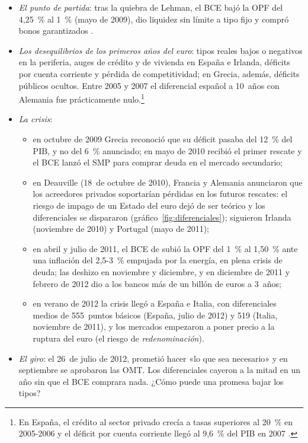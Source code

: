 \documentclass[11pt]{article}
\begin{document}
\begin{itemize}
\item \emph{El punto de partida}: tras la quiebra de Lehman, el BCE bajó la OPF del 4,25~\% al 1~\% (mayo de 2009), dio liquidez sin límite a tipo fijo y compró bonos garantizados .
\item \emph{Los desequilibrios de los primeros años del euro}: tipos reales bajos o negativos en la periferia, auges de crédito y de vivienda en España e Irlanda, déficits por cuenta corriente y pérdida de competitividad; en Grecia, además, déficits públicos ocultos. Entre 2005 y 2007 el diferencial español a 10~años con Alemania fue prácticamente nulo.\footnote{En España, el crédito al sector privado crecía a tasas superiores al 20~\% en 2005-2006 y el déficit por cuenta corriente llegó al 9,6~\% del PIB en 2007  .}
\item \emph{La crisis}:
  \begin{itemize}
  \item en octubre de 2009 Grecia reconoció que su déficit pasaba del 12~\% del PIB, y no del 6~\% anunciado; en mayo de 2010 recibió el primer rescate y el BCE lanzó el SMP para comprar deuda en el mercado secundario\nocite{BCE2010SMP};
  \item en Deauville (18~de octubre de 2010)\nocite{Elysee2010Deauville}, Francia y Alemania anunciaron que los acreedores privados soportarían pérdidas en los futuros rescates: el riesgo de impago de un Estado del euro dejó de ser teórico y los diferenciales se dispararon (gráfico~\ref{fig:diferenciales}); siguieron Irlanda (noviembre de 2010) y Portugal (mayo de 2011);
  \item en abril y julio de 2011\nocite{BCE2026TiposOficiales}, el BCE de  subió la OPF del 1~\% al 1,50~\% ante una inflación del 2,5-3~\% empujada por la energía, en plena crisis de deuda;  las deshizo en noviembre y diciembre, y en diciembre de 2011 y febrero de 2012 dio a los bancos más de un billón de euros a 3~años;
  \item en verano de 2012 la crisis llegó a España e Italia, con diferenciales medios de 555~puntos básicos (España, julio de 2012) y 519 (Italia, noviembre de 2011)\nocite{BCE2026IRS}, y los mercados empezaron a poner precio a la ruptura del euro (el riesgo de \emph{redenominación}).
  \end{itemize}
\item \emph{El giro}: el 26~de julio de 2012,  prometió hacer «lo que sea necesario» y en septiembre se aprobaron las OMT. Los diferenciales cayeron a la mitad en un año sin que el BCE comprara nada\nocite{BCE2012OMTanuncio,BCE2026IRS}. ¿Cómo puede una promesa bajar los tipos?
\end{itemize}
\end{document}
